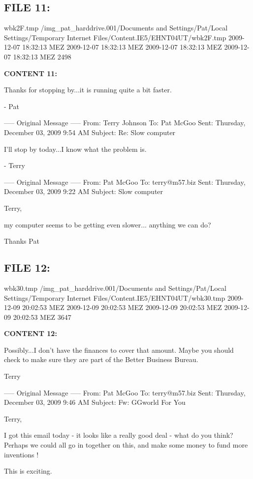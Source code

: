 \subsection{FILE 11:}
wbk2F.tmp	/img_pat_harddrive.001/Documents and Settings/Pat/Local Settings/Temporary Internet Files/Content.IE5/EHNT04UT/wbk2F.tmp		2009-12-07 18:32:13 MEZ	2009-12-07 18:32:13 MEZ	2009-12-07 18:32:13 MEZ	2009-12-07 18:32:13 MEZ	2498	

\textbf{CONTENT 11:}

Thanks for stopping by...it is running quite a bit faster.

- Pat

----- Original Message -----
From: Terry Johnson
To: Pat McGoo
Sent: Thursday, December 03, 2009 9:54 AM
Subject: Re: Slow computer

I'll stop by today...I know what the problem is.

- Terry

----- Original Message -----
From: Pat McGoo
To: terry@m57.biz
Sent: Thursday, December 03, 2009 9:22 AM
Subject: Slow computer

Terry,

my computer seems to be getting even slower...  anything we can do?

Thanks
Pat


\subsection{FILE 12:}
wbk30.tmp	/img_pat_harddrive.001/Documents and Settings/Pat/Local Settings/Temporary Internet Files/Content.IE5/EHNT04UT/wbk30.tmp		2009-12-09 20:02:53 MEZ	2009-12-09 20:02:53 MEZ	2009-12-09 20:02:53 MEZ	2009-12-09 20:02:53 MEZ	3647	

\textbf{CONTENT 12:}

Possibly...I don't have the finances to cover that amount.  Maybe you 
should check to make sure they are part of the Better Business Bureau. 

Terry

----- Original Message -----
From: Pat McGoo
To: terry@m57.biz
Sent: Thursday, December 03, 2009 9:46 AM
Subject: Fw: GGworld For You

Terry,

I got this email today - it looks like a really good deal - what do
you think?  Perhaps we could all go in together on this, and make some
money to fund more inventions !

This is exciting.

